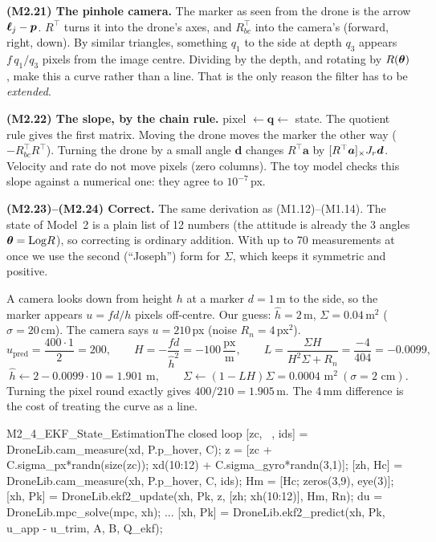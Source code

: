 \textbf{(M2.21) The pinhole camera.} The marker as seen from the drone is the arrow $\bm\ell_j-\bm{p}$. $R^\top$ turns it into
the drone's axes, and $R_{bc}^\top$ into the camera's (forward, right, down). By similar triangles, something $q_1$ to the
side at depth $q_3$ appears $f\,q_1/q_3$ pixels from the image centre. Dividing by the depth, and rotating by $R(\bm{\theta})$,
make this a curve rather than a line. That is the only reason the filter has to be \emph{extended}.

\textbf{(M2.22) The slope, by the chain rule.} pixel $\leftarrow\bm q\leftarrow$ state. The quotient rule gives the first
matrix. Moving the drone moves the marker the other way ($-R_{bc}^\top R^\top$). Turning the drone by a small angle
$\bm d$ changes $R^\top\bm a$ by $[R^\top\bm a]_{\times}J_r\bm d$. Velocity and rate do not move pixels (zero columns). The
toy model checks this slope against a numerical one: they agree to $10^{-7}$\,px.

\textbf{(M2.23)--(M2.24) Correct.} The same derivation as (M1.12)--(M1.14). The state of Model~2 is a plain list of 12
numbers (the attitude is already the 3 angles $\bm{\theta}=\mathrm{Log} R$), so correcting is ordinary addition. With up to 70
measurements at once we use the second (``Joseph'') form for $\Sigma$, which keeps it symmetric and positive.

\begin{toy}
A camera looks down from height $h$ at a marker $d=1$\,m to the side, so the marker appears $u=fd/h$ pixels off-centre.
Our guess: $\hat h=2$\,m, $\Sigma=0.04$\,m$^2$ ($\sigma=20$\,cm). The camera says $u=210$\,px (noise $R_n=4$\,px$^2$).
\[
u_{\text{pred}}=\frac{400\cdot1}{2}=200,\qquad H=-\frac{fd}{\hat h^2}=-100\,\frac{\text{px}}{\text{m}},\qquad
L=\frac{\Sigma H}{H^2\Sigma+R_n}=\frac{-4}{404}=-0.0099,
\]
\[
\hat h\leftarrow2-0.0099\cdot10=1.901\text{ m},\qquad \Sigma\leftarrow(1-LH)\Sigma=0.0004\text{ m}^2\ (\sigma=2\text{ cm}).
\]
Turning the pixel round exactly gives $400/210=1.905$\,m. The 4\,mm difference is the cost of treating the curve as a
line.
\end{toy}

\begin{toycode}{M2\_4\_EKF\_State\_Estimation}{The closed loop}
[zc, ~, ids] = DroneLib.cam_measure(xd, P.p_hover, C);          %
z = [zc + C.sigma_px*randn(size(zc)); xd(10:12) + C.sigma_gyro*randn(3,1)];
[zh, Hc] = DroneLib.cam_measure(xh, P.p_hover, C, ids);         %
Hm = [Hc; zeros(3,9), eye(3)];
[xh, Pk] = DroneLib.ekf2_update(xh, Pk, z, [zh; xh(10:12)], Hm, Rn);   %
du = DroneLib.mpc_solve(mpc, xh);                                %
...
[xh, Pk] = DroneLib.ekf2_predict(xh, Pk, u_app - u_trim, A, B, Q_ekf); %
\end{toycode}

